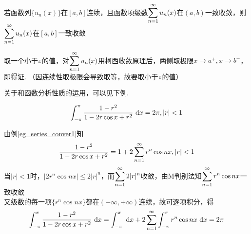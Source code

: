 \begin{example}
若函数列$\{u_n(x)\}$在$[a,b]$连续，且函数项级数$\displaystyle\sum_{n=1}^{\infty}u_n(x)$在$(a,b)$一致收敛，则$\displaystyle\sum_{n=1}^{\infty}u_n(x)$在$[a,b]$一致收敛
\end{example}
\begin{analysis}
取一个小于$\varepsilon$的值，对$\displaystyle\sum_{n=1}^{\infty}u_n(x)$用柯西收敛原理后，两侧取极限$x\to a^+,x\to b^-$，即得证. （因连续性取极限会导致取等，故要取小于$\varepsilon$的值）
\end{analysis}
\par 关于和函数分析性质的运用，可以见下例.
\begin{example}
\label{eg:sum_fun_analysis}
\[\displaystyle\int_{-\pi}^{\pi}{\dfrac{1-r^2}{1-2r\cos x+r^2}}\,\,\mathrm{d} x=2\pi,|r|<1\]
\end{example}
\begin{analysis}
由例\ref{eg_series_conver1}知
\[\dfrac{1-r^2}{1-2r\cos x+r^2}=1+2\displaystyle\sum_{n=1}^{\infty}r^n\cos nx,|r|<1\]
当$|r|<1$时，$|2r^n\cos nx|\leq 2|r|^n$，而$\displaystyle\sum_{n=1}^{\infty}2|r|^n$收敛，由M判别法知$\displaystyle\sum_{n=1}^{\infty}r^n\cos nx$一致收敛\\
又级数的每一项$\{r^n\cos nx\}$都在$(-\infty,+\infty)$连续，故可逐项积分，得
\[\displaystyle\int_{-\pi}^{\pi}{\dfrac{1-r^2}{1-2r\cos x+r^2}}\,\,\mathrm{d} x=\displaystyle\int_{-\pi}^{\pi}{}\,\,\mathrm{d} x+2\displaystyle\sum_{n=1}^{\infty}\displaystyle\int_{-\pi}^{\pi}{r^n\cos nx}\,\,\mathrm{d} x=2\pi\]
\end{analysis}

